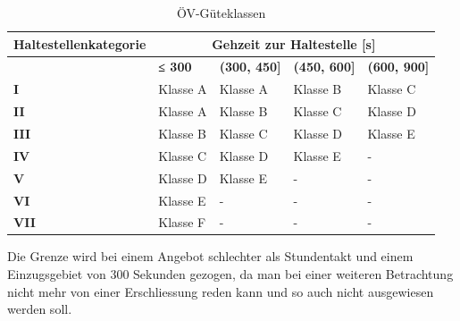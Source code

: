 \begin{table}[H]
    \begin{tabular}[c]{l p{2.6cm} p{2.6cm} p{2.6cm} p{2.6cm}}
        \toprule
        \textbf{Haltestellenkategorie}
                                & \multicolumn{4}{c}{\textbf{Gehzeit zur Haltestelle [s]}}\\
        \midrule
        \textbf{}
                                & \textbf{≤ 300}
                                & \textbf{(300, 450]}
                                & \textbf{(450, 600]}
                                & \textbf{(600, 900]}\\
        \textbf{I}
                                & Klasse A
                                & Klasse A
                                & Klasse B
                                & Klasse C\\
        \textbf{II}
                                & Klasse A
                                & Klasse B
                                & Klasse C
                                & Klasse D\\
        \textbf{III}
                                & Klasse B
                                & Klasse C
                                & Klasse D
                                & Klasse E\\
        \textbf{IV}
                                & Klasse C
                                & Klasse D
                                & Klasse E
                                & -\\
        \textbf{V}
                                & Klasse D
                                & Klasse E
                                & -
                                & -\\
        \textbf{VI}
                                & Klasse E
                                & -
                                & -
                                & -\\
        \textbf{VII}
                                & Klasse F
                                & -
                                & -
                                & -\\                                
        \bottomrule
    \end{tabular}
    \caption{ÖV-Güteklassen}
    \label{table:ÖV-Güteklassen}
\end{table}

Die Grenze wird bei einem Angebot schlechter als Stundentakt und einem Einzugsgebiet von 300 Sekunden gezogen, da man bei einer weiteren Betrachtung nicht mehr von einer Erschliessung reden kann und so auch nicht ausgewiesen werden soll.
